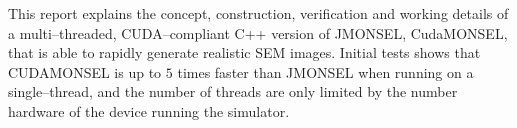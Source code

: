 This report explains the concept, construction, verification and working details of a multi--threaded, CUDA--compliant C++ version of JMONSEL, CudaMONSEL, that is able to rapidly generate realistic SEM images. Initial tests shows that CUDAMONSEL is up to $5$ times faster than JMONSEL when running on a single--thread, and the number of threads are only limited by the number hardware of the device running the simulator.